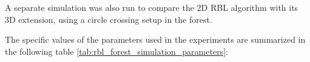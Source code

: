             A separate simulation was also run to compare the 2D \ac{RBL} algorithm with its 3D extension, using a circle crossing setup in the forest.

            The specific values of the parameters used in the experiments are summarized in the following table \ref{tab:rbl_forest_simulation_parameters}:



